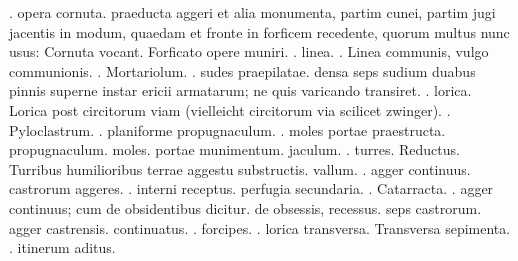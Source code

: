 . opera cornuta. praeducta aggeri et alia monumenta, partim cunei, partim jugi jacentis in modum, quaedam et fronte in forficem recedente, quorum multus nunc usus: Cornuta vocant. Forficato opere muniri.
\pend%
\pstart%
 . linea.
\pend%
\pstart%
. Linea communis, vulgo communionis.
\pend%
\pstart%
. Mortariolum.
\pend%
\newpage
\pstart%
. sudes praepilatae. densa seps sudium duabus pinnis superne instar ericii armatarum; ne quis varicando transiret.
\pend%
\pstart%
. lorica. Lorica post circitorum viam (vielleicht circitorum via scilicet zwinger).%
\pend%
\pstart%
. Pyloclastrum.
\pend%
\pstart%
. planiforme propugnaculum.
\pend%
\pstart%
. moles portae praestructa. propugnaculum. moles. portae munimentum. jaculum.%
\pend%
\pstart%
. turres. Reductus. Turribus humilioribus terrae aggestu substructis.
vallum.
\pend%
\pstart%
. agger continuus. castrorum aggeres.
\pend%
\pstart%
. interni receptus. perfugia secundaria.
\pend%
\pstart%
.  Catarracta.
\pend%
\pstart%
. agger continuus; cum de obsidentibus dicitur. de obsessis, recessus. seps castrorum. agger castrensis. continuatus.
\pend%
\pstart%
. forcipes.
\pend%
\pstart%
. lorica transversa. Transversa sepimenta.
\pend%
\pstart%
. itinerum aditus.%
